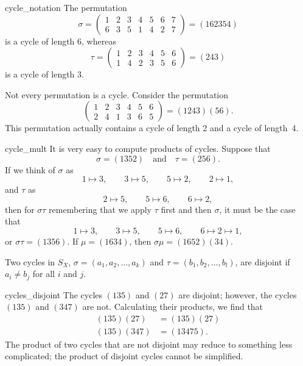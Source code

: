  
\begin{example}{cycle_notation}
The permutation
\[
\sigma =
\begin{pmatrix}
1 & 2 & 3 & 4 & 5 & 6 & 7\\
6 & 3 & 5 & 1 & 4 & 2 & 7
\end{pmatrix}
=
(1 6 2 3 5 4 )
\]
is a cycle of length 6, whereas
\[
\tau =
\begin{pmatrix}
1 & 2 & 3 & 4 & 5 & 6 \\
1 & 4 & 2 & 3 & 5 & 6
\end{pmatrix}
=
(2 4 3)
\]
is a cycle of length 3.
 
 
Not every permutation is a cycle. Consider the permutation
\[
\begin{pmatrix}
1 & 2 & 3 & 4 & 5 & 6 \\
2 & 4 & 1 & 3 & 6 & 5
\end{pmatrix}
 = (1 2 4 3)(5 6).
\]
This permutation actually contains a cycle of length 2 and a cycle
of length~4. 
\hspace*{1in}
\end{example}
 
 

\begin{example}{cycle_mult}
It is very easy to compute products of cycles. Suppose that
\[
\sigma  = (1 3 5 2 ) \quad \text{and} \quad
\tau    = (2 5 6).
\]
If we think of $\sigma$ as
\[
1  \mapsto  3, \qquad
3  \mapsto  5, \qquad
5  \mapsto  2, \qquad
2  \mapsto  1,
\]
and $\tau$ as
\[
2  \mapsto  5, \qquad
5  \mapsto  6, \qquad
6  \mapsto  2,
\]
then for $\sigma \tau$ remembering that we apply $\tau$ first and then $\sigma$, it must be the case that
\[
1  \mapsto  3, \qquad
3  \mapsto  5, \qquad
5  \mapsto  6, \qquad
6  \mapsto  2 \mapsto 1,
\]
or $\sigma \tau =  (1 3 5 6 )$.  
If $\mu = (1634)$, then $\sigma \mu = (1 6 5 2)(3 4)$.
\end{example}
 
 \smallskip
 
Two cycles in $S_X$, $\sigma = (a_1, a_2, \ldots, a_k )$ and $\tau =
(b_1, b_2, \ldots, b_l )$, are {\bfi disjoint}
if $a_i \neq b_j$ for all $i$ and $j$. 
 
\begin{example}{cycles_disjoint}
The  cycles $(1 3 5)$ and $(2 7 )$ are disjoint; however, the cycles
$(1 3 5)$ and $(3 4 7 )$ are not.  Calculating their products, we find
that 
\begin{align*}
(1 3 5)(2 7 ) & = (1 3 5)(2 7 ) \\
(1 3 5)(3 4 7 ) & = (1 3 4 7 5).
\end{align*}
The product of two cycles that are not disjoint may reduce to
something less complicated; the product of disjoint cycles cannot be 
simplified. 
\end{example}
 
